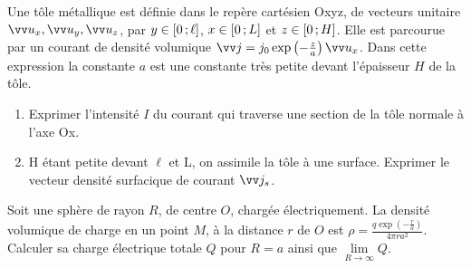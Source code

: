 \begin{exercice}%
  Une tôle métallique est définie dans le repère cartésien Oxyz, de vecteurs 
  unitaire \(\ux, \uy, \uz\), par \(y \in \left[ 0 \, ;  \ell \right]\), \(x \in 
  \left[ 0 \, ;  L \right]\) et \(z \in \left[ 0 \, ;  H \right]\). Elle est parcourue 
  par un courant de densité volumique \(\vj = j_0 \exp\left(-\frac{z}{a}\right) 
  \ux\). Dans cette expression la constante \(a\) est une constante très petite 
  devant l'épaisseur \(H\) de la tôle.
  \begin{enumerate}
  \item Exprimer l'intensité \(I\) du courant qui traverse une section de la 
    tôle normale à l'axe Ox.
  \item H étant petite devant \(\ell\) et L, on assimile la tôle à une surface. 
    Exprimer le vecteur densité surfacique de courant \(\vj_s\).
  \end{enumerate}
\end{exercice}%
\begin{exercice}%
  Soit une sphère de rayon \(R\), de centre \(O\), chargée électriquement. La 
  densité volumique de charge en un point \(M\), à la distance \(r\) de \(O\) 
  est \(\rho = \frac{q \exp\left(-\frac{r}{a}\right)}{4 \pi r a^2}\). Calculer 
  sa charge électrique totale \(Q\) pour \(R = a\) ainsi que \(\lim\limits_{R 
  \to \infty} Q\).
\end{exercice}%

